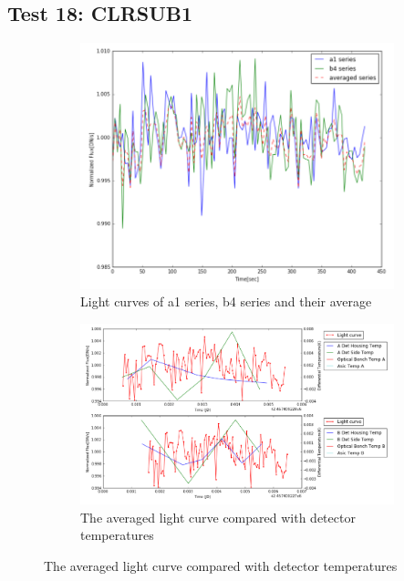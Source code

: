 \documentclass{aastex6}
\begin{document}
\subsection{Test 18: CLRSUB1} 
\begin{figure}[H]
    \centering
    \begin{subfigure}{1}
        \includegraphics[scale=0.4]{ts_test18}
        \caption{Light curves of a1 series, b4 series and their average}
    \end{subfigure}

    \begin{subfigure}{2}
        \includegraphics[scale=0.4]{temp_test18}
        \caption{The averaged light curve compared with detector temperatures}
    \end{subfigure}
   

\end{figure}
\end{document}
